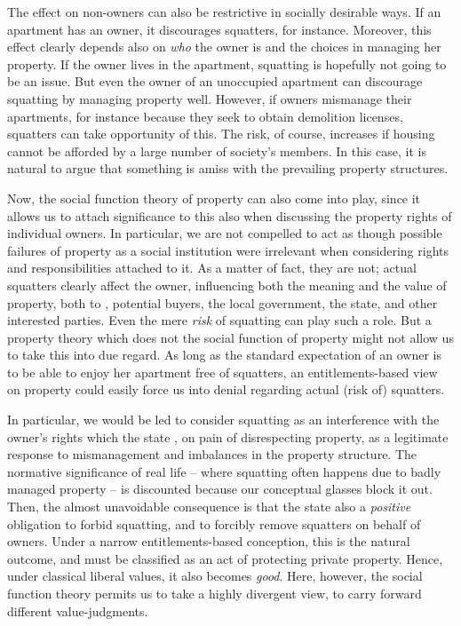 The effect on non-owners can also be restrictive in socially desirable ways. If an apartment has an owner, it discourages squatters, for instance. Moreover, this effect clearly depends also on {\it who} the owner is and the choices  in managing her property. If the owner lives in the apartment, squatting is hopefully not going to be an issue. But even the owner of an unoccupied apartment can discourage squatting by managing  property well. However, if owners mismanage their apartments, for instance because they seek to obtain demolition licenses, squatters can take opportunity of this. The risk, of course, increases if housing cannot be afforded by a large number of  society's members. In this case, it is natural to argue that something is amiss with the prevailing property structures.

Now, the social function theory of property can also come into play, since it allows us to attach significance to this also when discussing the property rights of individual owners.  In particular, we are not compelled to act as though possible failures of property as a social institution were irrelevant when considering rights and responsibilities attached to it. As a matter of fact, they are not; actual squatters clearly affect the owner, influencing both the meaning and the value of  property, both to , potential buyers, the local government, the state, and other interested parties. Even the mere {\it risk} of squatting can play such a role. But a property theory which does not  the social function of property might not allow us to take this into due regard. As long as the standard expectation of an owner is to be able to enjoy her apartment free of squatters, an entitlements-based view on property could easily force us into denial regarding actual (risk of) squatters.

In particular, we would be led to consider squatting as an interference with the owner's rights which the state , on pain of disrespecting property,  as a legitimate response to mismanagement and imbalances in the property structure. The normative significance of real life -- where squatting often happens due to badly managed property -- is discounted  because our conceptual  glasses block it out. Then, the almost unavoidable consequence is that the state also  a {\it positive} obligation to forbid squatting, and to forcibly remove squatters on behalf of owners. Under a narrow entitlements-based conception, this is the natural outcome, and must be classified as an act of protecting private property. Hence, under classical liberal values, it also becomes {\it good}. Here, however, the social function theory permits us to take a highly divergent view, to carry forward different value-judgments.

